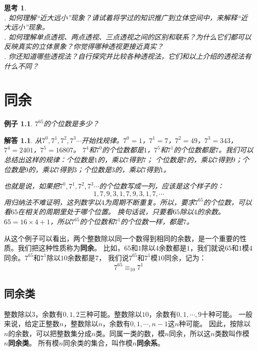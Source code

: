 \documentclass[12pt,UTF8]{ctexbook}
\newtheorem{ex}{例子}[section]
\newtheorem{sk}{思考}[section]
\newtheorem*{so}{解答}
\begin{document}
\begin{sk}
    \mbox{}\\
    . 如何理解“近大远小”现象？请试着将学过的知识推广到立体空间中，来解释“近大远小”现象。\\
    . 如何理解单点透视、两点透视、三点透视之间的区别和联系？为什么它们都可以反映真实的立体景象？你觉得哪种透视更接近真实？\\
    . 你还知道哪些透视法？自行探究并比较各种透视法，它们和以上介绍的透视法有什么不同？
\end{sk}

\chapter{同余}
\begin{ex}\label{ex:3-0-0}
    $7^{65}$的个位数是多少？
\end{ex}
\begin{so}
    从$7^0,7^1,7^2,7^3\cdots$开始找规律。$7^0=1$，$7^1=7$，$7^2=49$，$7^3=343$，$7^4=2401$，$7^5=16807$。
    $7^4$和$7^0$的个位数都是$1$，$7^5$和$7^1$的个位数都是$7$。我们可以总结出这样的规律：个位数是$1$的，乘以$7$得到$7$；
    个位数是$7$的，乘以$7$得到$9$；个位数是$9$的，乘以$7$得到$3$；个位数是$3$的，乘以$7$得到$1$。

    也就是说，如果把$7^0,7^1,7^2,7^3\cdots$的个位数写成一列，应该是这个样子的：
    $$ 1, 7, 9, 3, 1, 7, 9, 3, 1, 7, \cdots$$
    用归纳法不难证明，这列数字以$4$为周期不断重复。所以，要求$7^{65}$的个位数，可以看$65$在相关的周期里处于哪个位置。
    换句话说，只要看$65$除以$4$的余数。$65 = 16 \times 4 + 1$，所以$7^{65}$的个位数和$7^1$的个位数一样，都是$7$。
\end{so}

从这个例子可以看出，两个整数除以同一个数得到相同的余数，是一个重要的性质。我们把这种性质称为\textbf{同余}。
比如，$65$和$1$除以$4$余数都是$1$，我们就说$65$和$1$模$4$同余。$7^{65}$和$7^1$除以$10$余数都是$7$，
我们说$7^{65}$和$7^1$模$10$同余，记为：
$$ 7^{65} \equiv_{10} 7^1 $$

\section{同余类}
整数除以$3$，余数有$0,1,2$三种可能。整数除以$10$，余数有$0,1,\cdots , 9$十种可能。
一般来说，给定正整数$n$，整数除以$n$，余数有$0,1,\cdots , n-1$这$n$种可能。
因此，按除以$n$的余数，可以把整数集分成$n$类。同属一类的数，模$n$同余，所以这$n$类数叫作模$n$\textbf{同余类}。
所有模$n$同余类的集合，叫作模$n$\textbf{同余系}。
\end{document}
